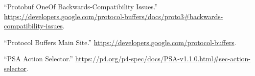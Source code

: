 \documentclass[11pt]{article}
\begin{document}
{{\begin{thebibliography}{44}
\mdbibitemlabel{{}[24]}\textquotedblleft{}Protobuf OneOf Backwards-Compatibility Issues.\textquotedblright{} \href{https://developers.google.com/protocol-buffers/docs/proto3\%23backwards-compatibility-issues}{{\ttfamily https://\hspace{0pt}developers.\hspace{0pt}google.\hspace{0pt}com/\hspace{0pt}protocol-\hspace{0pt}buffers/\hspace{0pt}docs/\hspace{0pt}proto3\#\hspace{0pt}backwards-\hspace{0pt}compatibility-\hspace{0pt}issues}}.\label{protooneofbackwardscompatibility}%

\mdbibitemlabel{{}[25]}\textquotedblleft{}Protocol Buffers Main Site.\textquotedblright{} \href{https://developers.google.com/protocol-buffers}{{\ttfamily https://\hspace{0pt}developers.\hspace{0pt}google.\hspace{0pt}com/\hspace{0pt}protocol-\hspace{0pt}buffers}}.\label{proto}%

\mdbibitemlabel{{}[26]}\textquotedblleft{}PSA Action Selector.\textquotedblright{} \href{https://p4.org/p4-spec/docs/PSA-v1.1.0.html\%23sec-action-selector}{{\ttfamily https://\hspace{0pt}p4.\hspace{0pt}org/\hspace{0pt}p4-\hspace{0pt}spec/\hspace{0pt}docs/\hspace{0pt}PSA-\hspace{0pt}v1.\hspace{0pt}1.\hspace{0pt}0.\hspace{0pt}html\#\hspace{0pt}sec-\hspace{0pt}action-\hspace{0pt}selector}}.\label{psaactionselector}%


\end{thebibliography}}}
\end{document}
